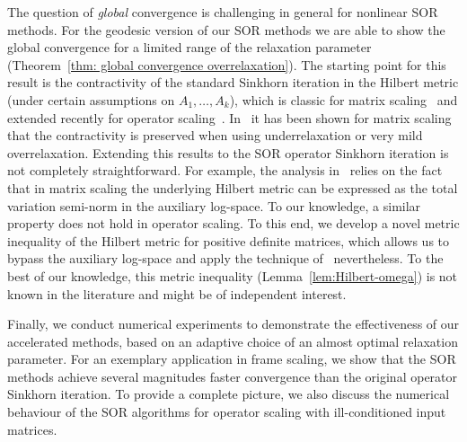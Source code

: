 \documentclass[a4paper]{article}
\theoremstyle{definition}
\numberwithin{equation}{section}
\begin{document}
The question of \emph{global} convergence is challenging in general for nonlinear SOR methods. For the geodesic version of our SOR methods we are able to show the global convergence for a limited range of the relaxation parameter (Theorem~\ref{thm: global convergence overrelaxation}). The starting point for this result is the contractivity of the standard Sinkhorn iteration in the Hilbert metric (under certain assumptions on $A_1,\dots,A_k$), which is classic for matrix scaling~\cite{Franklin1989} and extended recently for operator scaling~\cite{Georgiou2015,Idel2016}. In~\cite{Lehmann2022} it has been shown for matrix scaling that the contractivity is preserved when using underrelaxation or very mild overrelaxation. Extending this results to the SOR operator Sinkhorn iteration is not completely straightforward. For example, the analysis in~\cite{Lehmann2022} relies on the fact that in matrix scaling the underlying Hilbert metric can be expressed as the total variation semi-norm in the auxiliary log-space. To our knowledge, a similar property does not hold in operator scaling. To this end, we develop a novel metric inequality of the Hilbert metric for positive definite matrices, which allows us to bypass the auxiliary log-space and apply the technique of~\cite{Lehmann2022} nevertheless. To the best of our knowledge, this metric inequality (Lemma~\ref{lem:Hilbert-omega}) is not known in the literature and might be of independent interest.

Finally, we conduct numerical experiments to demonstrate the effectiveness of our accelerated methods, based on an adaptive choice of an almost optimal relaxation parameter. For an exemplary application in frame scaling, we show that the SOR methods achieve several magnitudes faster convergence than the original operator Sinkhorn iteration. To provide a complete picture, we also discuss the numerical behaviour of the SOR algorithms for operator scaling with ill-conditioned input matrices.
\end{document}
